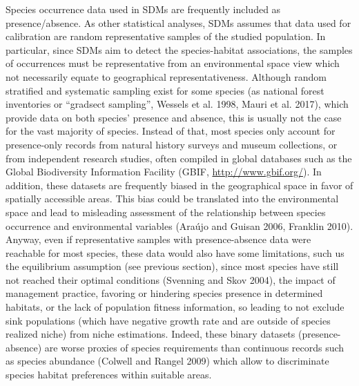 \documentclass[11pt,twoside]{reedthesis}
\begin{document}
Species occurrence data used in SDMs are frequently included as
presence/absence. As other statistical analyses, SDMs assumes that data
used for calibration are random representative samples of the studied
population. In particular, since SDMs aim to detect the species-habitat
associations, the samples of occurrences must be representative from an
environmental space view which not necessarily equate to geographical
representativeness. Although random stratified and systematic sampling
exist for some species (as national forest inventories or ``gradsect
sampling'', Wessels et al. 1998, Mauri et al. 2017), which provide data
on both species' presence and absence, this is usually not the case for
the vast majority of species. Instead of that, most species only account
for presence-only records from natural history surveys and museum
collections, or from independent research studies, often compiled in
global databases such as the Global Biodiversity Information Facility
(GBIF, \url{http://www.gbif.org/}). In addition, these datasets are
frequently biased in the geographical space in favor of spatially
accessible areas. This bias could be translated into the environmental
space and lead to misleading assessment of the relationship between
species occurrence and environmental variables (Araújo and Guisan 2006,
Franklin 2010). Anyway, even if representative samples with
presence-absence data were reachable for most species, these data would
also have some limitations, such us the equilibrium assumption (see
previous section), since most species have still not reached their
optimal conditions (Svenning and Skov 2004), the impact of management
practice, favoring or hindering species presence in determined habitats,
or the lack of population fitness information, so leading to not exclude
sink populations (which have negative growth rate and are outside of
species realized niche) from niche estimations. Indeed, these binary
datasets (presence-absence) are worse proxies of species requirements
than continuous records such as species abundance (Colwell and Rangel
2009) which allow to discriminate species habitat preferences within
suitable areas.\par
\end{document}
